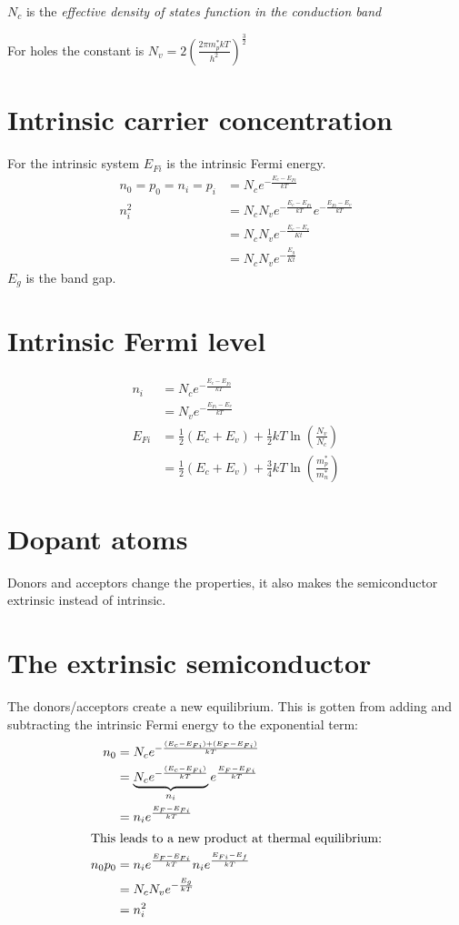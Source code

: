 \documentclass[article,oneside]{memoir}
\begin{document}
$N_{c}$ is the \emph{effective density of states function in the conduction band}

For holes the constant is $N_v=2\left( \frac{2\pi m_{p}^*kT}{h^2} \right)^{\frac{3}{2}}$

\chapter{Intrinsic carrier concentration}
For the intrinsic system $E_{Fi}$ is the intrinsic Fermi energy.
\begin{align*}
        n_0=p_0=n_i=p_i&=N_ce^{-\frac{E_c-E_{Fi}}{kT}}\\
        n_i^2&=N_cN_ve^{-\frac{E_c-E_{Fi}}{kT}}e^{-\frac{E_{Fi}-E_{v}}{kT}}\\
        &=N_cN_ve^{-\frac{E_c-E_v}{Kt}}\\
        &=N_cN_ve^{-\frac{E_g}{Kt}}
\end{align*}
$E_g$ is the band gap.
\chapter{Intrinsic Fermi level}
\begin{align*}
        n_i&=N_ce^{-\frac{E_c-E_{Fi}}{kT}}\\
        &=N_ve^{-\frac{E_{Fi}-E_{v}}{kT}}\\
        E_{Fi}&=\frac{1}{2}\left( E_c+E_v \right) +\frac{1}{2}kT\ln\left( \frac{N_v}{N_c} \right)\\
        &=\frac{1}{2}\left( E_c+E_v \right) +\frac{3}{4}kT\ln\left( \frac{m_{p}^*}{m_n^*} \right)
\end{align*}
\chapter{Dopant atoms}

Donors and acceptors change the properties, it also makes the semiconductor extrinsic instead of intrinsic.

\chapter{The extrinsic semiconductor}


The donors/acceptors create a new equilibrium. This is gotten from adding and subtracting the intrinsic Fermi energy to the exponential term:
\begin{align*}
        n_0&=N_ce^{-\frac{(E_c-E_{Fi})+(E_F-E_{Fi})}{kT}}\\
        &=\underbrace{N_ce^{-\frac{(E_c-E_{Fi})}{kT}}}_{n_i}e^{\frac{E_F-E_{Fi}}{kT}}\\
        &=n_ie^{\frac{E_F-E_{Fi}}{kT}}\\
        \intertext{This leads to a new product at thermal equilibrium:}
        n_0p_0&=n_ie^{\frac{E_F-E_{Fi}}{kT}}n_ie^{\frac{E_{Fi}-E_{f}}{kT}}\\
        &=N_cN_ve^{-\frac{E_g}{kT}}\\
        &=n_i^2
\end{align*}
\end{document}
